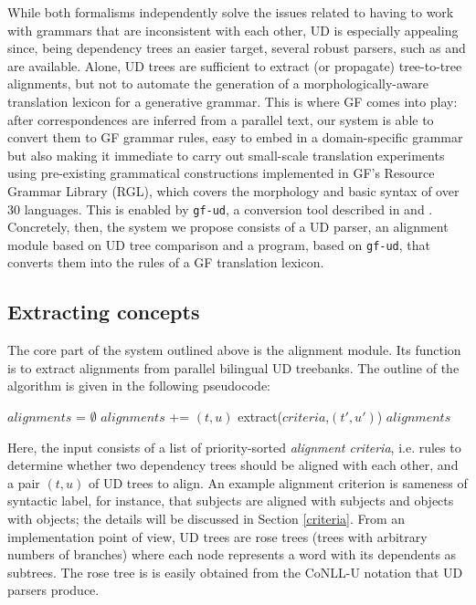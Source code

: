 \documentclass[11pt]{article}
\begin{document}
While both formalisms independently solve the issues related to having to work with grammars that are inconsistent with each other, UD is especially appealing since, being dependency trees an easier target, several robust parsers, such as \cite{straka-etal-2016-udpipe} and \cite{chen-manning-2014-fast} are available.
Alone, UD trees are sufficient to extract (or propagate) tree-to-tree alignments, but not to automate the generation of a morphologically-aware translation lexicon for a generative grammar. 
This is where GF comes into play: after correspondences are inferred from a parallel text, our system is able to convert them to GF grammar rules, easy to embed in a domain-specific grammar but also making it immediate to carry out small-scale translation experiments using pre-existing grammatical constructions implemented in GF's Resource Grammar Library (RGL), which covers the morphology and basic syntax of over 30 languages.
This is enabled by \texttt{gf-ud}, a conversion tool described in \cite{kolachina-ranta-2016-abstract} and \cite{ranta-kolachina-2017-universal}.
Concretely, then, the system we propose consists of a UD parser, an alignment module based on UD tree comparison and a program, based on \texttt{gf-ud}, that converts them into the rules of a GF translation lexicon.

\subsection{Extracting concepts} 
The core part of the system outlined above is the alignment module. 
Its function is to extract alignments from parallel bilingual UD treebanks.
The outline of the algorithm is given in the following pseudocode:

\begin{algorithm} 
  \small
  \begin{algorithmic}
    \State $alignments$ = $\emptyset$
        \State $alignments$ += $(t,u)$
          \State extract($criteria$,$(t',u')$)
        \EndFor
    \EndIf
    \Return $alignments$
  \EndProcedure
  \end{algorithmic}
  \end{algorithm}

Here, the input consists of a list of priority-sorted \textit{alignment criteria}, i.e. rules to determine whether two dependency trees should be aligned with each other, and a pair $(t,u)$ of UD trees to align.
An example alignment criterion is sameness of syntactic label, for instance, that subjects are aligned with subjects and objects with objects; the details will be discussed in Section \ref{criteria}.  
From an implementation point of view, UD trees are rose trees (trees with arbitrary numbers of branches) where each node represents a word with its dependents as subtrees.
The rose tree is is easily obtained from the CoNLL-U notation that UD parsers produce.
\end{document}
